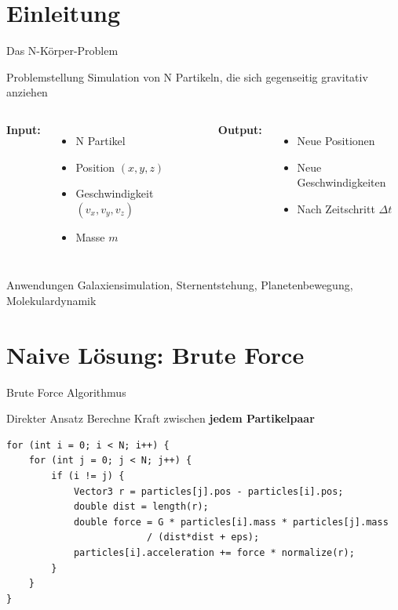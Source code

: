\documentclass[xcolor=dvipsnames]{beamer}
\begin{document}
\section{Einleitung}

\begin{frame}{Das N-Körper-Problem}
\begin{block}{Problemstellung}
Simulation von N Partikeln, die sich gegenseitig gravitativ anziehen
\end{block}

\begin{columns}
\textbf{Input:}
\begin{itemize}
    \item N Partikel
    \item Position $(x, y, z)$
    \item Geschwindigkeit $(v_x, v_y, v_z)$
    \item Masse $m$
\end{itemize}

\textbf{Output:}
\begin{itemize}
    \item Neue Positionen
    \item Neue Geschwindigkeiten
    \item Nach Zeitschritt $\Delta t$
\end{itemize}
\end{columns}

\vspace{0.5cm}
\begin{exampleblock}{Anwendungen}
Galaxiensimulation, Sternentstehung, Planetenbewegung, Molekulardynamik
\end{exampleblock}
\end{frame}

\section{Naive Lösung: Brute Force}

\begin{frame}[fragile]{Brute Force Algorithmus}
\begin{block}{Direkter Ansatz}
Berechne Kraft zwischen \textbf{jedem Partikelpaar}
\end{block}

\begin{lstlisting}
for (int i = 0; i < N; i++) {
    for (int j = 0; j < N; j++) {
        if (i != j) {
            Vector3 r = particles[j].pos - particles[i].pos;
            double dist = length(r);
            double force = G * particles[i].mass * particles[j].mass
                         / (dist*dist + eps);
            particles[i].acceleration += force * normalize(r);
        }
    }
}
\end{lstlisting}
\end{frame}
\end{document}
